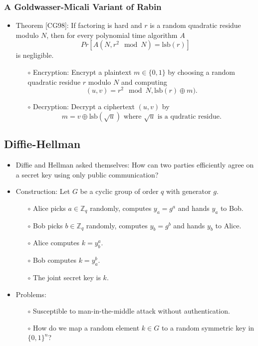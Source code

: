 \documentclass[a4paper]{scrartcl}
\begin{document}
\subsubsection*{A Goldwasser-Micali Variant of Rabin}

\begin{itemize}
\item Theorem [CG98]: If factoring is hard and $r$ is a random quadratic residue modulo $N$, then for every polynomial time algorithm $A$ $$Pr[A(N,r^2 \mod N) = \text{lsb}(r)]$$ is negligible.
\begin{itemize}
\item [$\circ$] Encryption: Encrypt a plaintext $m \in \{0,1\}$ by choosing a random quadratic residue $r$ modulo $N$ and computing $$(u,v) = r^2 \mod N, \text{lsb}(r) \oplus m).$$
\item [$\circ$] Decryption: Decrypt a ciphertext $(u,v)$ by $$m = v \oplus \text{lsb}(\sqrt{u}) \text{ \ where $\sqrt{u}$ is a qudratic residue.}$$
\end{itemize}
\end{itemize}

\subsection*{Diffie-Hellman}

\begin{itemize}
\item Diffie and Hellman asked themselves: How can two parties efficiently agree on a secret key using only public communication?
\item Construction: Let $G$ be a cyclic group of order $q$ with generator $g$.
\begin{itemize}
\item [$\circ$] Alice picks $a \in \mathbb{Z}_q$ randomly, computes $y_a = g^a$ and hands $y_a$ to Bob.
\item [$\circ$] Bob picks $b \in \mathbb{Z}_q$ randomly, computes $y_b = g^b$ and hands $y_b$ to Alice.
\item [$\circ$] Alice computes $k = y_b^a$. 
\item [$\circ$] Bob computes $k = y_a^b$.
\item [$\circ$] The joint secret key is $k$.
\end{itemize}
\item Problems:
\begin{itemize}
\item [$\circ$] Susceptible to man-in-the-middle attack without authentication.
\item [$\circ$] How do we map a random element $k \in G$ to a random symmetric key in $\{0,1\}^n$?
\end{itemize}
\end{itemize}
\end{document}
